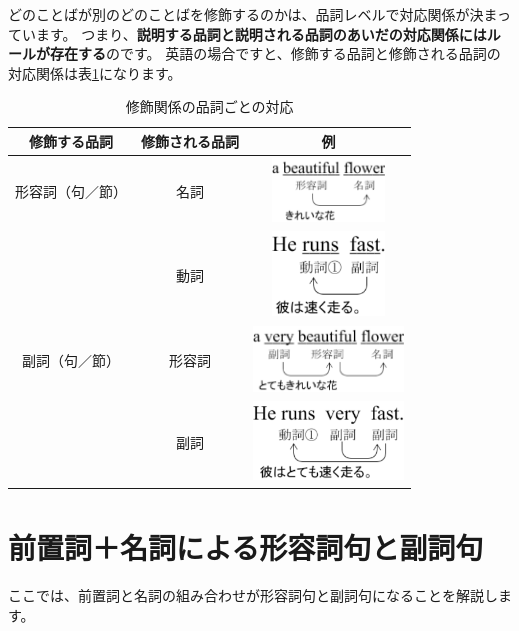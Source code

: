 \documentclass[12pt,titlepage]{jsarticle}
\begin{document}
 どのことばが別のどのことばを修飾するのかは、品詞レベルで対応関係が決まっています。
 つまり、{\bf 説明する品詞と説明される品詞のあいだの対応関係にはルールが存在する}のです。
 英語の場合ですと、修飾する品詞と修飾される品詞の対応関係は表\ref{tab3}になります。
 \begin{table}[htbp]
  \begin{center}
   \caption{修飾関係の品詞ごとの対応}
   \begin{tabular}{|c|c|c|}
    \hline
    修飾する品詞 & 修飾される品詞 & 例 \\ \hline \hline
    形容詞（句／節） & 名詞 & \includegraphics[width=3cm]{./figure/tab3_1.pdf} \\
    \hline
    & 動詞 & \includegraphics[width=3cm]{./figure/tab3_2.pdf} \\ \cline{2-3}
    副詞（句／節）& 形容詞 & \includegraphics[width=4cm]{./figure/tab3_3.pdf} \\ \cline{2-3}
    & 副詞 & \includegraphics[width=4cm]{./figure/tab3_4.pdf} \\ \hline
   \end{tabular}
   \label{tab3}
  \end{center}
 \end{table}


 \section{前置詞＋名詞による形容詞句と副詞句}
 ここでは、前置詞と名詞の組み合わせが形容詞句と副詞句になることを解説します。
 
\end{document}

